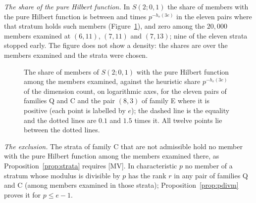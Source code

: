 \documentclass[11pt]{article}
\theoremstyle{definition}
\theoremstyle{remark}
\newcommand{\F}{\mathbb{F}}
\begin{document}
\begin{table}[htbp]
\centering\footnotesize

\caption{One pure pair found by the search in the strata for each pair $(e,p)$ settled by it (the five pairs open after the linear family and three pairs at $e=8$): the stratum, the forms over $\F_p$ (coefficients of least absolute value) and the length of $U/(Uf+Ug)$ (equal to $e^3$); the script recomputes the Hilbert function, the rank of $\mu_{3e}$ and the stratum of each pair, and both instruments give the Betti table $(1,2,2,1)$ on $(0,e,3e,4e)$.}
\label{tab:wcpairs}
\end{table}

\emph{The share of the pure Hilbert function.} In $S(2;0,1)$ the share of members with the pure Hilbert function is between \nwcRatioMin{} and \nwcRatioMax{} times $p^{-h_e(3e)}$ in the eleven pairs where that stratum holds such members (Figure~\ref{fig:wcshare}), and zero among the $20{,}000$ members examined at $(6,11)$, $(7,11)$ and $(7,13)$; nine of the eleven strata stopped early. The figure does not show a density: the shares are over the members examined and the strata were chosen.

\begin{figure}[htbp]
\centering

\caption{The share of members of $S(2;0,1)$ with the pure Hilbert function among the members examined, against the heuristic share $p^{-h_e(3e)}$ of the dimension count, on logarithmic axes, for the eleven pairs of families Q and C and the pair $(8,3)$ of family E where it is positive (each point is labelled by $e$); the dashed line is the equality and the dotted lines are $0.1$ and $1.5$ times it. All twelve points lie between the dotted lines.}
\label{fig:wcshare}
\end{figure}

\emph{The exclusion.} The \nwcNonAdm{} strata of family C that are not admissible hold no member with the pure Hilbert function among the \nwcNonAdmMembers{} members examined there, as Proposition~\ref{prop:strata} requires [MV]. In characteristic $p$ no member of a stratum whose modulus is divisible by $p$ has the rank $r$ in any pair of families Q and C (among \nwcPfourMembers{} members examined in those strata); Proposition~\ref{prop:pdivm} proves it for $p\le e-1$.
\end{document}
